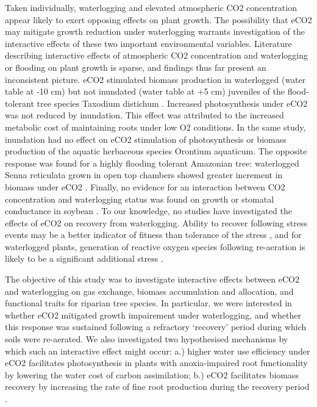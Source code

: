 \documentclass[12pt,a4paper]{memoir}
\begin{document}
Taken individually, waterlogging and elevated atmospheric CO2 concentration appear likely to exert opposing effects on plant growth. The possibility that eCO2 may mitigate growth reduction under waterlogging warrants investigation of the interactive effects of these two important environmental variables. Literature describing interactive effects of atmospheric CO2 concentration and waterlogging or flooding on plant growth is sparse, and findings thus far present an inconsistent picture. eCO2 stimulated biomass production in waterlogged (water table at -10 cm) but not inundated (water table at +5 cm) juveniles of the flood-tolerant tree species Taxodium distichum \cite{Megonigal2005}. Increased photosynthesis under eCO2 was not reduced by inundation. This effect was attributed to the increased metabolic cost of maintaining roots under low O2 conditions. In the same study, inundation had no effect on eCO2 stimulation of photosynthesis or biomass production of the aquatic herbaceous species Orontium aquaticum.  The opposite response was found for a highly flooding tolerant Amazonian tree: waterlogged Senna reticulata grown in open top chambers showed greater increment in biomass under eCO2 \cite{Arenque2014}. Finally, no evidence for an interaction between CO2 concentration and waterlogging status was found on growth or stomatal conductance in soybean \cite{Shimono2012}. To our knowledge, no studies have investigated the effects of eCO2 on recovery from waterlogging. Ability to recover following stress events may be a better indicator of fitness than tolerance of the stress \cite{Gutschick2003}, and for waterlogged plants, generation of reactive oxygen species following re-aeration is likely to be a significant additional stress \cite{Drew1997}. 

The objective of this study was to investigate interactive effects between eCO2 and waterlogging on gas exchange, biomass accumulation and allocation, and functional traits for riparian tree species. In particular, we were interested in whether eCO2 mitigated growth impairement under waterlogging, and whether this response was sustained following a refractory ‘recovery’ period during which soils were re-aerated. We also investigated two hypothesised mechanisms by which such an interactive effect might occur: a.) higher water use efficiency under eCO2 \cite{Holtum2010} facilitates photosynthesis in plants with anoxia-impaired root functionality by lowering the water cost of carbon assimilation; b.) eCO2 facilitates biomass recovery by increasing the rate of fine root production during the recovery period \cite{Pregitzer1995}.  
\end{document}
